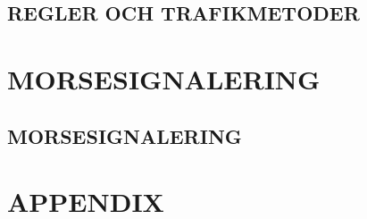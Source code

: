 \documentclass[a4paper,twoside,twocolumn,openright]{book}
\begin{document}
\chapter{REGLER OCH TRAFIKMETODER}


\part{MORSESIGNALERING}
\chapter{MORSESIGNALERING}



\appendix
\part{APPENDIX}













\listoffigures
\listoftables

\onecolumn


\twocolumn

\backmatter

\printindex
\end{document}
